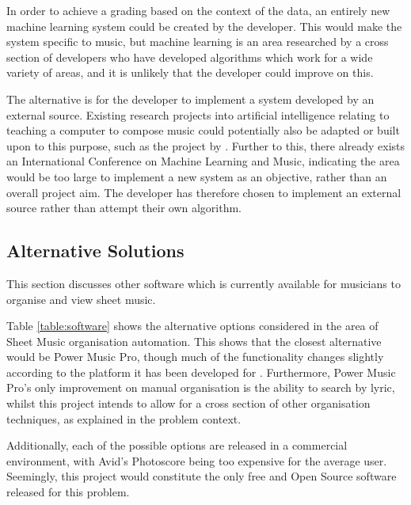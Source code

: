 In order to achieve a grading based on the context of the data, an entirely new machine learning system could be created by the developer. This would make the system specific to music, but machine learning is an area researched by a cross section of developers who have developed algorithms which work for a wide variety of areas, and it is unlikely that the developer could improve on this.

The alternative is for the developer to implement a system developed by an external source.
Existing research projects into artificial intelligence relating to teaching a computer to compose music could potentially also be adapted or built upon to this purpose, such as the project by \cite{creativeMachines}. Further to this, there already exists an International Conference on Machine Learning and Music, indicating the area would be too large to implement a new system as an objective, rather than an overall project aim.
The developer has therefore chosen to implement an external source rather than attempt their own algorithm.


\subsection{Alternative Solutions}
This section discusses other software which is currently available for musicians to organise and view sheet music.

Table \ref{table:software} shows the alternative options considered in the area of Sheet Music organisation automation. This shows that the closest alternative would be Power Music Pro, though much of the functionality changes slightly according to the platform it has been developed for \parencite{PowerMusic}. Furthermore, Power Music Pro's only improvement on manual organisation is the ability to search by lyric, whilst this project intends to allow for a cross section of other organisation techniques, as explained in the problem context.

Additionally, each of the possible options are released in a commercial environment, with Avid's Photoscore being too expensive for the average user.  Seemingly, this project would constitute the only free and Open Source software released for this problem.

